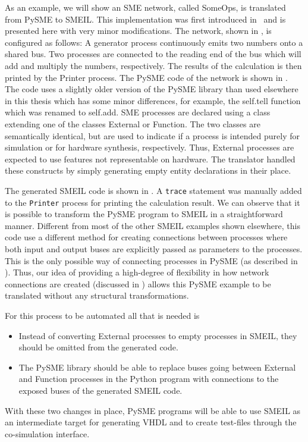As an example, we will show an SME network, called SomeOps, is translated from
PySME to SMEIL. This implementation was first introduced in~\cite{asheim2016vhdl}
and is presented here with very minor modifications. The network, shown in
, is configured as follows: A generator process continuously
emits two numbers onto a shared bus. Two processes are connected to the reading
end of the bus which will add and multiply the numbers, respectively. The
results of the calculation is then printed by the Printer process.  The PySME
code of the network is shown in . The code uses a slightly
older version of the PySME library than used elsewhere in this thesis which has
some minor differences, for example, the {\ttfamily self.tell} function which
was renamed to {\ttfamily self.add}.  SME processes are declared using a class
extending one of the classes {\ttfamily External} or {\ttfamily Function}.  The
two classes are semantically identical, but are used to indicate if a process is
intended purely for simulation or for hardware synthesis, respectively.  Thus,
{\ttfamily External} processes are expected to use features not representable on
hardware.  The translator handled these constructs by simply generating empty
entity declarations in their place.

The generated SMEIL code is shown in . A {\tt trace}
statement was manually added to the {\tt Printer} process for printing the
calculation result. We can observe that it is possible to transform the PySME
program to SMEIL in a straightforward manner. Different from most of the other
SMEIL examples shown elsewhere, this code use a different method for creating
connections between processes where both input and output buses are explicitly
passed as parameters to the processes. This is the only possible way of
connecting processes in PySME (as described in ). Thus, our idea
of providing a high-degree of flexibility in how network connections are created
(discussed in ) allows this PySME example to be translated
without any structural transformations.

For this process to be automated all that is needed is
\begin{itemize}
  \item Instead of converting {\ttfamily External} processes to empty processes
    in SMEIL, they should be omitted from the generated code.
  \item The PySME library should be able to replace buses going between
    {\ttfamily External} and {\ttfamily Function} processes in the Python
    program with connections to the {\ttfamily exposed} buses of the generated
    SMEIL code.
\end{itemize}
With these two changes in place, PySME programs will be able to use SMEIL as an
intermediate target for generating VHDL and to create test-files through the
co-simulation interface.


